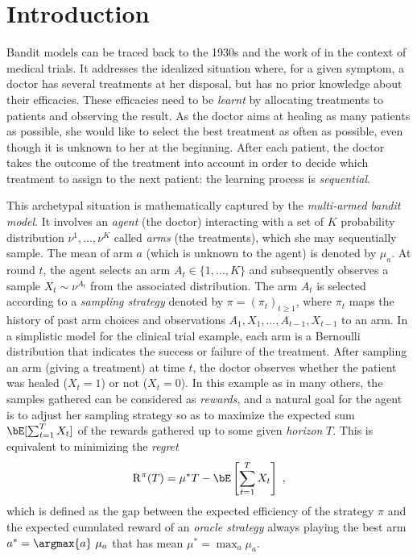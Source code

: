 \documentclass[proc]{edpsmath}
\begin{document}
	\section*{Introduction}
	
	Bandit models can be traced back to the 1930s and the work of \cite{Thompson33} in the context of medical trials. It addresses the idealized situation where, for a given symptom, a doctor has several treatments at her disposal, but has no prior knowledge about their efficacies. These efficacies need to be \emph{learnt} by allocating treatments to patients and observing the result. As the doctor aims at healing as many patients as possible, she would like to select the best treatment as often as possible, even though it is unknown to her at the beginning. After each patient, the doctor takes the outcome of the treatment into account in order to decide which treatment to assign to the next patient: the learning process is \emph{sequential}. 
	
	This archetypal situation is mathematically captured by the \emph{multi-armed bandit model}. It involves an \emph{agent} (the doctor) interacting with a set of $K$ probability distribution $\nu^1,\dots,\nu^K$ called \emph{arms} (the treatments), which she may sequentially sample. The mean of arm $a$  (which is unknown to the agent) is denoted by $\mu_a$. At round $t$, the agent selects an arm $A_t\in\{1,\dots,K\}$ and subsequently observes a sample $X_t \sim \nu^{A_t}$ from the associated distribution. The arm $A_t$ is selected according to a \emph{sampling strategy} denoted by $\pi=(\pi_t)_{t\geq 1}$, where $\pi_t$  maps the history of past arm choices and observations $A_1,X_1,\dots,A_{t-1},X_{t-1}$ to an arm. In a simplistic model for the clinical trial example, each arm is a Bernoulli distribution that indicates the success or failure of the treatment. After sampling an arm (giving a treatment) at time $t$, the doctor observes whether the patient was healed ($X_t=1$) or not ($X_t=0$). In this example as in many others, the samples gathered can be considered as \emph{rewards}, and a natural goal for the agent is to adjust her sampling strategy so as to maximize the expected sum  $\bE[\sum_{t=1}^T X_t]$ of the rewards gathered up to some given \emph{horizon} $T$. This is equivalent to minimizing the \emph{regret}
	\[\mathrm{R}^\pi(T) = \mu^*T - \bE\left[\sum_{t=1}^T X_t\right]\;,\]
	which is defined as the gap between the expected efficiency of the strategy $\pi$ and the expected cumulated reward of an \emph{oracle strategy} always playing the best arm $a^* = \argmax{a} \ \mu_a$ that has mean $\mu^* = \max_a \mu_a$.
	
\end{document}
